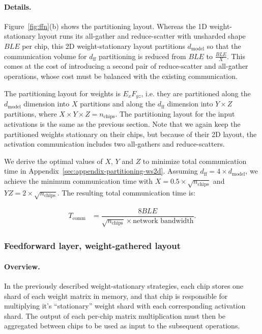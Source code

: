 \paragraph{Details.} Figure~\ref{fig:ffn}(b) shows the partitioning layout. Whereas the 1D weight-stationary layout runs its all-gather and reduce-scatter with unsharded shape $BLE$ per chip, this 2D weight-stationary layout partitions $d_{\textrm{model}}$ so that the communication volume for $d_{\textrm{ff}}$ partitioning is reduced from $BLE$ to $\frac{BLE}{X}$. This comes at the cost of introducing a second pair of reduce-scatter and all-gather operations, whose cost must be balanced with the existing communication.

The partitioning layout for weights is $E_{x}F_{yz}$, i.e. they are partitioned along the $d_{\textrm{model}}$ dimension into $X$ partitions and along the $d_{\textrm{ff}}$ dimension into $Y\times Z$ partitions, where $X \times Y\times Z = n_{\textrm{chips}}$. The partitioning layout for the input activations is the same as the previous section. Note that we again keep the partitioned weights stationary on their chips, but because of their 2D layout, the activation communication includes two all-gathers and reduce-scatters.

We derive the optimal values of $X$, $Y$ and $Z$ to minimize total communication time in Appendix~\ref{sec:appendix-partitioning-ws2d}. Assuming $d_{\textrm{ff}}=4 \times d_{\textrm{model}}$, 
we achieve the minimum communication time with $X=0.5\times\sqrt{n_{\textrm{chips}}}$ 
and $YZ=2\times\sqrt{n_{\textrm{chips}}}$. The resulting total communication time is:

\begin{align*}
    T_\textrm{comm} &= \dfrac{8 B L E}{\sqrt{n_{\textrm{chips}}}\times \textrm{network bandwidth}}.
\end{align*}

\subsubsection{Feedforward layer, weight-gathered layout}
\label{sec:weight-gathered}
\paragraph{Overview.} In the previously described weight-stationary strategies, each chip stores one shard of each weight matrix in memory, and that chip is responsible for multiplying it's ``stationary'' weight shard with each corresponding activation shard. The output of each per-chip matrix multiplication must then be aggregated between chips to be used as input to the subsequent operations.

